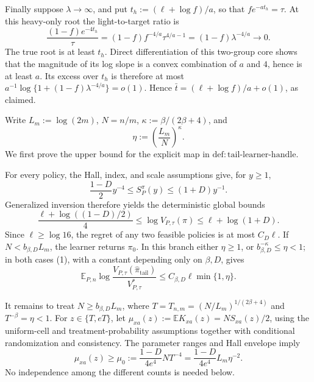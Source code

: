 Finally suppose \(\lambda\to\infty\), and put \(t_h:=(\ell+\log f)/a\), so that \(fe^{-at_h}=\tau\).  At this heavy-only root the light-to-target ratio is
\[
\frac{(1-f)e^{-4t_h}}{\tau}
=(1-f)f^{-4/a}\tau^{4/a-1}
=(1-f)\lambda^{-4/a}\longrightarrow0.                                  \tag{2}
\]
The true root is at least \(t_h\).  Direct differentiation of this two-group core shows that the magnitude of its log slope is a convex combination of \(a\) and \(4\), hence is at least \(a\).  Its excess over \(t_h\) is therefore at most \(a^{-1}\log\{1+(1-f)\lambda^{-4/a}\}=o(1)\).  Hence \(\bar t=(\ell+\log f)/a+o(1)\), as claimed.

Write \(L_m:=\log(2m)\), \(N=n/m\), \(\kappa:=\beta/(2\beta+4)\), and
\[
\eta:=\left(\frac{L_m}{N}\right)^\kappa.
\]
We first prove the upper bound for the explicit map in \(\mathrm{def{:}tail\text{-}learner\text{-}handle}\).

For every policy, the Hall, index, and scale assumptions give, for \(y\geq1\),
\[
\frac{1-D}{2}y^{-4}\leq S_P^\pi(y)\leq(1+D)y^{-1}.
\]
Generalized inversion therefore yields the deterministic global bounds
\[
\frac{\ell+\log((1-D)/2)}4
\leq\log V_{P,\tau}(\pi)
\leq\ell+\log(1+D).                                                       \tag{1}
\]
Since \(\ell\geq\log16\), the regret of any two feasible policies is at most \(C_D\ell\).  If \(N<b_{\beta,D}L_m\), the learner returns \(\pi_0\).  In this branch either \(\eta\geq1\), or \(b_{\beta,D}^{-\kappa}\leq\eta<1\); in both cases (1), with a constant depending only on \(\beta,D\), gives
\[
\mathbb E_{P,n}\log\frac{V_{P,\tau}(\widehat\pi_{\mathrm{tail}})}{V^*_{P,\tau}}
\leq C_{\beta,D}\ell\min\{1,\eta\}.                                   \tag{2}
\]

It remains to treat \(N\geq b_{\beta,D}L_m\), where \(T=T_{n,m}=(N/L_m)^{1/(2\beta+4)}\) and \(T^{-\beta}=\eta<1\).  For \(z\in\{T,eT\}\), let \(\mu_{xa}(z):=\mathbb E K_{xa}(z)=NS_{xa}(z)/2\), using the uniform-cell and treatment-probability assumptions together with conditional randomization and consistency.  The parameter ranges and Hall envelope imply
\[
\mu_{xa}(z)\geq \mu_0:=\frac{1-D}{4e^4}NT^{-4}
=\frac{1-D}{4e^4}L_m\eta^{-2}.                                          \tag{3}
\]
No independence among the different counts is needed below.

